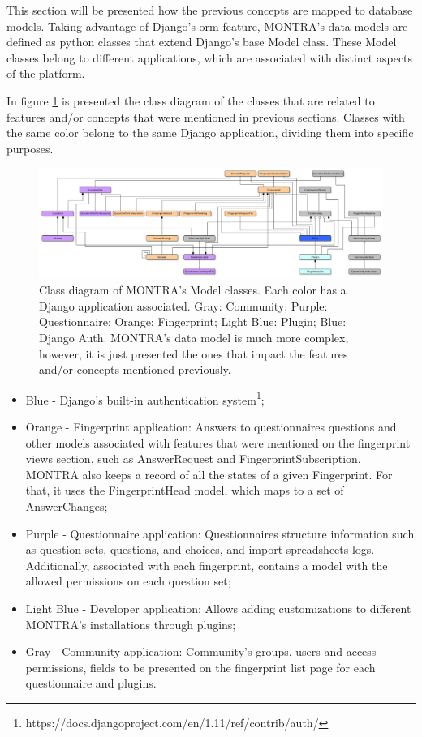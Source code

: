 This section will be presented how the previous concepts are mapped to database models.
Taking advantage of Django's \gls{orm} feature, MONTRA's data models are defined as python classes that extend Django's base Model class.
These Model classes belong to different applications, which are associated with distinct aspects of the platform.

In figure \ref{fig:old-models} is presented the class diagram of the classes that are related to features and/or concepts that were mentioned in previous sections.
Classes with the same color belong to the same Django application, dividing them into specific purposes.

\begin{figure}
    \includegraphics[width=\textwidth]{old-models}
    \caption{Class diagram of MONTRA's Model classes. Each color has a Django application associated. Gray: Community; Purple: Questionnaire; Orange: Fingerprint; Light Blue: Plugin; Blue: Django Auth. MONTRA's data model is much more complex, however, it is just presented the ones that impact the features and/or concepts mentioned previously.}
    \label{fig:old-models}
\end{figure}

\begin{itemize}
    \item Blue - Django's built-in authentication system\footnote{https://docs.djangoproject.com/en/1.11/ref/contrib/auth/};
    \item Orange - Fingerprint application: Answers to questionnaires questions and other models associated with features that were mentioned on the fingerprint views section, such as AnswerRequest and FingerprintSubscription.
        MONTRA also keeps a record of all the states of a given Fingerprint.
        For that, it uses the FingerprintHead model, which maps to a set of AnswerChanges;
    \item Purple - Questionnaire application: Questionnaires structure information such as question sets, questions, and choices, and import spreadsheets logs. Additionally, associated with each fingerprint, contains a model with the allowed permissions on each question set;
    \item Light Blue - Developer application: Allows adding customizations to different MONTRA's installations through plugins;
    \item Gray - Community application: Community's groups, users and access permissions, fields to be presented on the fingerprint list page for each questionnaire and plugins.
\end{itemize}

